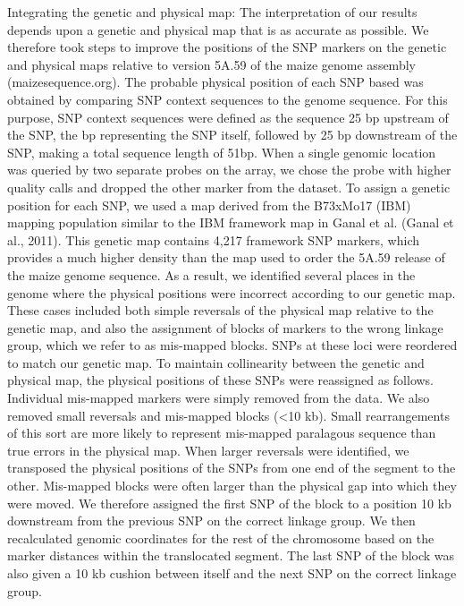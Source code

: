 Integrating the genetic and physical map:  The interpretation of our results depends upon a genetic and physical map that is as accurate as possible. We therefore took steps to improve the positions of the SNP markers on the genetic and physical maps relative to version 5A.59 of the maize genome assembly (maizesequence.org). 
The probable physical position of each SNP based was obtained by comparing SNP context sequences to the genome sequence. For this purpose, SNP context sequences were defined as the sequence 25 bp upstream of the SNP, the bp representing the SNP itself, followed by 25 bp downstream of the SNP, making a total sequence length of 51bp. 
When a single genomic location was queried by two separate probes on the array, we chose the probe with higher quality calls and dropped the other marker from the dataset. 
To assign a genetic position for each SNP, we used a map derived from the B73xMo17 (IBM) mapping population similar to the IBM framework map in Ganal et al. (Ganal et al., 2011). 
This genetic map contains 4,217 framework SNP markers, which provides a much higher density than the map used to order the 5A.59 release of the maize genome sequence. As a result, we identified several places in the genome where the physical positions were incorrect according to our genetic map. 
These cases included both simple reversals of the physical map relative to the genetic map, and also the assignment of blocks of markers to the wrong linkage group, which we refer to as mis-mapped blocks. SNPs at these loci were reordered to match our genetic map. To maintain collinearity between the genetic and physical map, the physical positions of these SNPs were reassigned as follows. Individual mis-mapped markers were simply removed from the data. 
We also removed small reversals and mis-mapped blocks (<10 kb). 
Small rearrangements of this sort are more likely to represent mis-mapped paralagous sequence than true errors in the physical map. 
When larger reversals were identified, we transposed the physical positions of the SNPs from one end of the segment to the other. 
Mis-mapped blocks were often larger than the physical gap into which they were moved. 
We therefore assigned the first SNP of the block to a position 10 kb downstream from the previous SNP on the correct linkage group. We then recalculated genomic coordinates for the rest of the chromosome based on the marker distances within the translocated segment. The last SNP of the block was also given a 10 kb cushion between itself and the next SNP on the correct linkage group. 

